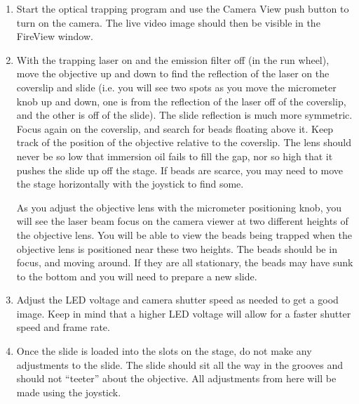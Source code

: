 \documentclass{../lab}
\begin{document}
\begin{enumerate}
    \item Start the optical trapping program and use the Camera View push button to turn on the camera. The live video image should then be visible in the FireView window.

    \item With the trapping laser on and the emission filter off (in the run wheel), move the objective up and down to find the reflection of the laser on the coverslip and slide (i.e. you will see two spots as you move the micrometer knob up and down, one is from the reflection of the laser off of the coverslip, and the other is off of the slide). The slide reflection is much more symmetric. Focus again on the coverslip, and search for beads floating above it. Keep track of the position of the objective relative to the coverslip. The lens should never be so low that immersion oil fails to fill the gap, nor so high that it pushes the slide up off the stage. If beads are scarce, you may need to move the stage horizontally with the joystick to find some.

    As you adjust the objective lens with the micrometer positioning knob, you will see the laser beam focus on the camera viewer at two different heights of the objective lens. You will be able to view the beads being trapped when the objective lens is positioned near these two heights. The beads should be in focus, and moving around. If they are all stationary, the beads may have sunk to the bottom and you will need to prepare a new slide.


    \item Adjust the LED voltage and camera shutter speed as needed to get a good image. Keep in mind that a higher LED voltage will allow for a faster shutter speed and frame rate.

    \item Once the slide is loaded into the slots on the stage, do not make any adjustments to the slide. The slide should sit all the way in the grooves and should not ``teeter'' about the objective. All adjustments from here will be made using the joystick.
\end{enumerate}
\end{document}
